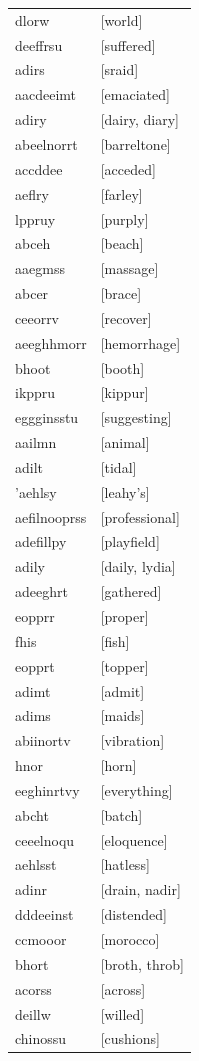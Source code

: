 \documentclass{article}
\begin{document}
\begin{tabular}{ll}
dlorw & [world] \\
deeffrsu & [suffered] \\
adirs & [sraid] \\
aacdeeimt & [emaciated] \\
adiry & [dairy, diary] \\
abeelnorrt & [barreltone] \\
accddee & [acceded] \\
aeflry & [farley] \\
lppruy & [purply] \\
abceh & [beach] \\
aaegmss & [massage] \\
abcer & [brace] \\
ceeorrv & [recover] \\
aeeghhmorr & [hemorrhage] \\
bhoot & [booth] \\
ikppru & [kippur] \\
eggginsstu & [suggesting] \\
aailmn & [animal] \\
adilt & [tidal] \\
'aehlsy & [leahy's] \\
aefilnooprss & [professional] \\
adefillpy & [playfield] \\
adily & [daily, lydia] \\
adeeghrt & [gathered] \\
eopprr & [proper] \\
fhis & [fish] \\
eopprt & [topper] \\
adimt & [admit] \\
adims & [maids] \\
abiinortv & [vibration] \\
hnor & [horn] \\
eeghinrtvy & [everything] \\
abcht & [batch] \\
ceeelnoqu & [eloquence] \\
aehlsst & [hatless] \\
adinr & [drain, nadir] \\
dddeeinst & [distended] \\
ccmooor & [morocco] \\
bhort & [broth, throb] \\
acorss & [across] \\
deillw & [willed] \\
chinossu & [cushions] \\

\end{tabular}
\end{document}
